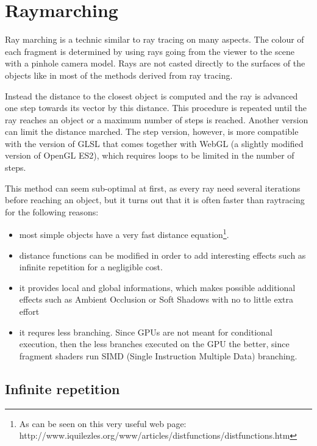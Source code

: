 \chapter{Raymarching}

Ray marching is a technic similar to ray tracing on many aspects. The colour of
each fragment is determined by using rays going from the viewer to the scene with
a pinhole camera model. Rays are not casted directly to the surfaces of the objects
like in most of the methods derived from ray tracing.

Instead the distance to the closest object is computed and the ray is advanced one step towards
its vector by this distance. This procedure is repeated
until the ray reaches an object or a maximum number of steps is reached. Another version can limit
the distance marched. The step version, however, is more compatible with the version
of GLSL that comes together with WebGL (a slightly modified version of OpenGL ES2), which requires
loops to be limited in the number of steps. 

This method can seem sub-optimal at first, as every ray need several iterations before reaching an object,
but it turns out that it is often faster than raytracing for the following reasons:
\begin{itemize}
 \item most simple objects have a very fast distance equation\footnote{As can be seen on this
 	very useful web page: http://www.iquilezles.org/www/articles/distfunctions/distfunctions.htm}.
 \item distance functions can be modified in order to add interesting effects such as
	infinite repetition for a negligible cost.
 \item it provides local and global informations, which makes possible additional effects
 	such as Ambient Occlusion or Soft Shadows with no to little extra effort
 \item it requres less branching. Since GPUs are not meant for conditional execution, then
 	the less branches executed on the GPU the better, since fragment shaders run SIMD
 	(Single Instruction Multiple Data) branching.
\end{itemize}


\section{Infinite repetition} 

